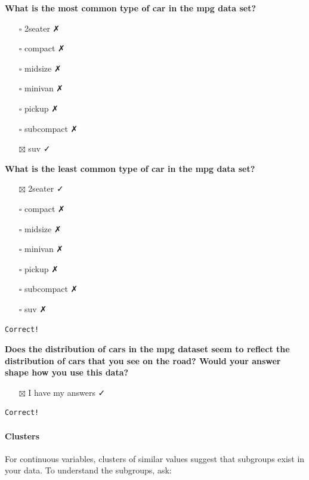 \documentclass[
]{article}
\providecommand{\tightlist}{%
  \setlength{\itemsep}{0pt}\setlength{\parskip}{0pt}}
\begin{document}
\textbf{What is the most common type of car in the mpg data set?}

\begin{itemize}
\tightlist
\item[$\square$]
  2seater ✗
\item[$\square$]
  compact ✗
\item[$\square$]
  midsize ✗
\item[$\square$]
  minivan ✗
\item[$\square$]
  pickup ✗
\item[$\square$]
  subcompact ✗
\item[$\boxtimes$]
  suv ✓
\end{itemize}

\textbf{What is the least common type of car in the mpg data set?}

\begin{itemize}
\tightlist
\item[$\boxtimes$]
  2seater ✓
\item[$\square$]
  compact ✗
\item[$\square$]
  midsize ✗
\item[$\square$]
  minivan ✗
\item[$\square$]
  pickup ✗
\item[$\square$]
  subcompact ✗
\item[$\square$]
  suv ✗
\end{itemize}

\begin{verbatim}
Correct!
\end{verbatim}

\textbf{Does the distribution of cars in the mpg dataset seem to reflect
the distribution of cars that you see on the road? Would your answer
shape how you use this data?}

\begin{itemize}
\tightlist
\item[$\boxtimes$]
  I have my answers ✓
\end{itemize}

\begin{verbatim}
Correct!
\end{verbatim}

\hypertarget{clusters}{%
\paragraph{Clusters}\label{clusters}}

For continuous variables, clusters of similar values suggest that
subgroups exist in your data. To understand the subgroups, ask:
\end{document}

